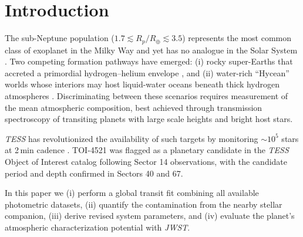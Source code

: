 \section{Introduction}
\label{sec:intro}

The sub-Neptune population ($1.7\lesssim R_p/R_\oplus \lesssim 3.5$)
represents the most common class of exoplanet in the Milky Way and yet
has no analogue in the Solar System
\citep{Howard2012,Fulton2017}.
Two competing formation pathways have emerged: (i) rocky super-Earths
that accreted a primordial hydrogen--helium envelope \citep{Owen2013},
and (ii) water-rich ``Hycean'' worlds whose interiors may host
liquid-water oceans beneath thick hydrogen atmospheres
\citep{Madhusudhan2021}.
Discriminating between these scenarios requires measurement of the
mean atmospheric composition, best achieved through transmission
spectroscopy of transiting planets with large scale heights and bright
host stars.

\textit{TESS} has revolutionized the availability of such targets by
monitoring $\sim 10^5$ stars at 2\,min cadence \citep{Ricker2015}.
TOI-4521 was flagged as a planetary candidate in the \textit{TESS}
Object of Interest catalog following Sector 14 observations, with the
candidate period and depth confirmed in Sectors 40 and 67.

In this paper we (i) perform a global transit fit combining all
available photometric datasets, (ii) quantify the contamination from
the nearby stellar companion, (iii) derive revised system parameters,
and (iv) evaluate the planet's atmospheric characterization potential
with \textit{JWST}.

